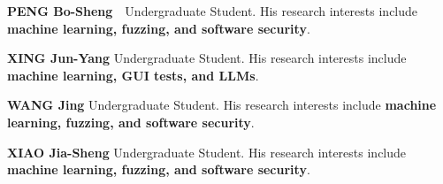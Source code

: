 \documentclass[10.5pt,compsoc]{CjC}
\theoremstyle{mystyle}
\begin{document}
\clearpage\clearpage

\begin{strip}
\end{strip}

\begin{biography}
\noindent
\textbf{PENG Bo-Sheng}\ \ Undergraduate Student. His research interests include \textbf{machine learning, fuzzing, and software security}.
\end{biography}

\vspace{10mm}
\begin{biography}
\noindent
\textbf{XING Jun-Yang} Undergraduate Student. His research interests include \textbf{machine learning, GUI tests, and LLMs}.
\end{biography}
\vspace{10mm}

\begin{biography}
  \noindent
  \textbf{WANG Jing} Undergraduate Student. His research interests include \textbf{machine learning, fuzzing, and software security}.
\end{biography}

\vspace{10mm}
\begin{biography}
\noindent
\textbf{XIAO Jia-Sheng} Undergraduate Student. His research interests include \textbf{machine learning, fuzzing, and software security}.
\end{biography}
 
\end{document}
